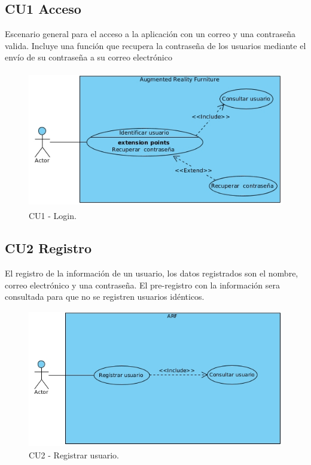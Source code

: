 \subsection{CU1 Acceso}\par
Escenario general para el acceso a la aplicación con un correo y una contraseña valida. Incluye una función que recupera la contraseña de los usuarios mediante el envío de su contraseña a su correo electrónico
\begin{figure}[h!]
	\centering
	\includegraphics[width=12cm,height=6cm]{imagenes/analisis/login.jpg}
	\caption{CU1 - Login.}
	
	\label{fig:analogo}
\end{figure}  
\subsection{CU2 Registro} \par
	El registro de la información de un usuario, los datos registrados son el nombre, correo electrónico y una contraseña. El pre-registro con la información sera consultada para que no se registren usuarios idénticos.
\begin{figure}[h!]
	\centering
	\includegraphics[width=12cm,height=6cm]{imagenes/analisis/registrarUsuario.jpg}
	\caption{CU2 - Registrar usuario.}
	\label{fig:analogo}
\end{figure} 
\newpage
